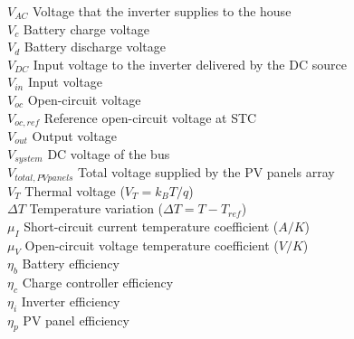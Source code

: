 $ V_{AC}  $ Voltage that the inverter supplies to the house \\
$V_{c}$ Battery charge voltage  \\
$V_{d}$ Battery discharge voltage \\
$ V_{DC} $ Input voltage to the inverter delivered by the DC source \\
$ V_{in} $ Input voltage \\
$ V_{oc} $ Open-circuit voltage \\
$ V_{oc,ref} $ Reference open-circuit voltage at STC \\
$ V_{out} $ Output voltage \\
$ V_{system} $ DC voltage of the bus \\
$V_{total,PVpanels}$ Total voltage supplied by the PV panels array \\
$V_{T}$ Thermal voltage ($ V_{T}=k_{B}T/q $) \\
$\Delta T$ Temperature variation ($\Delta T=T-T_{ref} $) \\
$ \mu_{I} $ Short-circuit current temperature coefficient ($A/K$) \\
$ \mu_{V} $ Open-circuit voltage temperature coefficient ($ V/K $) \\
$\eta_{b}$ Battery efficiency \\
$\eta_{c}$ Charge controller efficiency \\
$\eta_{i}$ Inverter efficiency \\
$\eta_{p}$ PV panel efficiency \\